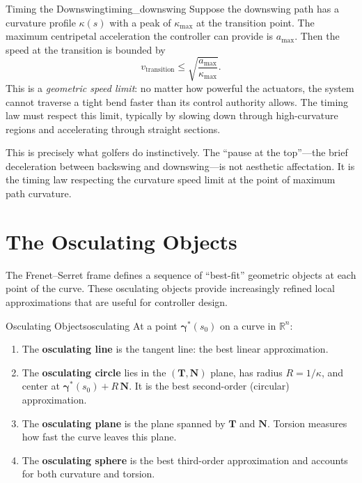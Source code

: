 \documentclass[12pt, openany]{book}
\theoremstyle{plain}
\newcommand{\traj}{\bm{\gamma}}
\newcommand{\Reals}{\mathbb{R}}
\newcommand{\tangent}{\bm{T}}
\newcommand{\normal}{\bm{N}}
\begin{document}
\begin{example}{Timing the Downswing}{timing_downswing}
  Suppose the downswing path has a curvature profile $\kappa(s)$ with a peak
  of $\kappa_{\max}$ at the transition point. The maximum centripetal
  acceleration the controller can provide is $a_{\max}$. Then the speed at
  the transition is bounded by
  \begin{equation}
    v_{\text{transition}} \leq \sqrt{\frac{a_{\max}}{\kappa_{\max}}}.
  \end{equation}
  This is a \emph{geometric speed limit}: no matter how powerful the actuators,
  the system cannot traverse a tight bend faster than its control authority
  allows. The timing law must respect this limit, typically by slowing down
  through high-curvature regions and accelerating through straight sections.

  This is precisely what golfers do instinctively. The ``pause at the top''---the
  brief deceleration between backswing and downswing---is not aesthetic
  affectation. It is the timing law respecting the curvature speed limit at
  the point of maximum path curvature.
\end{example}

\section{The Osculating Objects}

The Frenet--Serret frame defines a sequence of ``best-fit'' geometric objects at
each point of the curve. These osculating objects provide increasingly refined
local approximations that are useful for controller design.

\begin{definition}{Osculating Objects}{osculating}
  At a point $\traj^*(s_0)$ on a curve in $\Reals^n$:
  \begin{enumerate}[label=(\roman*)]
    \item The \textbf{osculating line} is the tangent line: the best linear
      approximation.
    \item The \textbf{osculating circle} lies in the $(\tangent, \normal)$ plane,
      has radius $R = 1/\kappa$, and center at $\traj^*(s_0) + R\,\normal$.
      It is the best second-order (circular) approximation.
    \item The \textbf{osculating plane} is the plane spanned by $\tangent$ and
      $\normal$. Torsion measures how fast the curve leaves this plane.
    \item The \textbf{osculating sphere} is the best third-order approximation
      and accounts for both curvature and torsion.
  \end{enumerate}
\end{definition}
\end{document}

